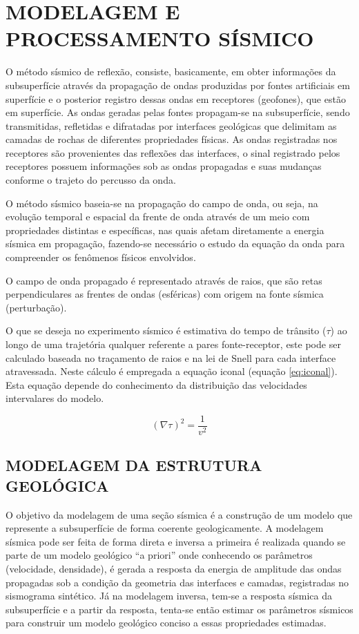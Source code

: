 \chapter{MODELAGEM E PROCESSAMENTO SÍSMICO}
\label{cap.2}

O método sísmico de reflexão, consiste, basicamente, em obter informações da subsuperfície através da propagação de ondas produzidas por fontes artificiais em superfície e o posterior registro dessas ondas em receptores (geofones), que estão em superfície.
As ondas geradas pelas fontes propagam-se na subsuperfície, sendo transmitidas, refletidas e difratadas por interfaces geológicas que delimitam as camadas de rochas de diferentes propriedades físicas.
As ondas registradas nos receptores são provenientes das reflexões das interfaces, o sinal registrado pelos receptores possuem informações sob as ondas propagadas e suas mudanças conforme o trajeto do percusso da onda.


O método sísmico baseia-se na propagação do campo de onda, ou seja, na evolução temporal e espacial da frente de onda através de um meio com propriedades distintas e específicas, nas quais afetam diretamente a energia sísmica em propagação, fazendo-se necessário o estudo da equação da onda para compreender os fenômenos físicos envolvidos.

O campo de onda propagado é representado através de raios, que são retas perpendiculares as frentes de ondas (esféricas) com origem na fonte sísmica (perturbação).

O que se deseja no experimento sísmico é estimativa do tempo de trânsito ($\tau$) ao longo de uma trajetória qualquer referente a pares fonte-receptor, este pode ser calculado baseada no traçamento de raios e na lei de Snell para cada interface atravessada. Neste cálculo é empregada a equação iconal (equação \ref{eq:iconal}). Esta equação depende do conhecimento da distribuição das velocidades intervalares do modelo.

\begin{equation}
(\nabla \tau)^{2}=\frac{1}{v^{2}}
\label{eq:iconal}
\end{equation}

\section{MODELAGEM DA ESTRUTURA GEOLÓGICA}

O objetivo da modelagem de uma seção sísmica é a construção de um modelo que represente a subsuperfície de forma coerente geologicamente. A modelagem sísmica pode ser feita de forma direta e inversa a primeira é realizada quando se parte de um modelo geológico ``a priori'' onde conhecendo os parâmetros (velocidade, densidade), é gerada a resposta da energia de amplitude das ondas propagadas sob a condição da geometria das interfaces e camadas, registradas no sismograma sintético. Já na modelagem inversa, tem-se a resposta sísmica da subsuperfície e a partir da resposta, tenta-se então estimar os parâmetros sísmicos para construir um modelo geológico conciso a essas propriedades estimadas.

